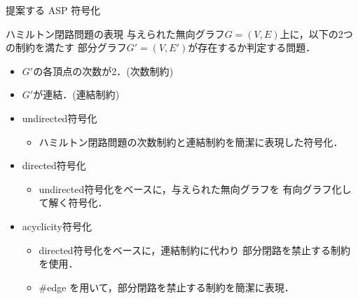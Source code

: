 \documentclass[dvipdfmx,10pt]{beamer}
\begin{document}
\begin{frame}{提案する ASP 符号化}
  \begin{block}{ハミルトン閉路問題の表現}
    与えられた無向グラフ$G= (V,E)$上に，以下の2つの制約を満たす
    部分グラフ$G'= (V,E')$が存在するか判定する問題．
    \begin{itemize}
    \item $G'$の各頂点の次数が2．(\alert{次数制約})
    \item $G'$が連結．(\alert{連結制約})
    \end{itemize}
  \end{block}
  \begin{itemize}
  \item \alert{\textsf{undirected}符号化}
    \begin{itemize}
    \item ハミルトン閉路問題の次数制約と連結制約を簡潔に表現した符号化．
    \end{itemize}
  \item \alert{\textsf{directed}符号化}
    \begin{itemize}
    \item \textsf{undirected}符号化をベースに，与えられた無向グラフを
      有向グラフ化して解く符号化．
    \end{itemize}
  \item \alert{\textsf{acyclicity}符号化}
    \begin{itemize}
    \item \textsf{directed}符号化をベースに，連結制約に代わり
      部分閉路を禁止する制約を使用．
      \item \#edge を用いて，部分閉路を禁止する制約を簡潔に表現．
    \end{itemize}
  \end{itemize}
\end{frame}
\end{document}
